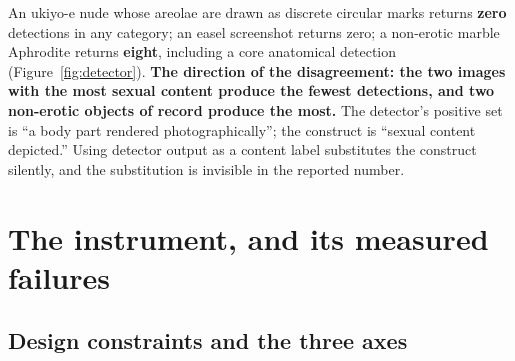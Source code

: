 \documentclass[11pt]{article}
\begin{document}
An ukiyo-e nude whose areolae are drawn as discrete circular marks returns
\textbf{zero} detections in any category; an easel screenshot returns zero; a
non-erotic marble Aphrodite returns \textbf{eight}, including a core anatomical
detection (Figure~\ref{fig:detector}). \textbf{The direction of the
disagreement: the two images with the most sexual content produce the fewest
detections, and two non-erotic objects of record produce the most.} The
detector's positive set is ``a body part rendered photographically''; the
construct is ``sexual content depicted.'' Using detector output as a content
label substitutes the construct silently, and the substitution is invisible in
the reported number.

\section{The instrument, and its measured failures}
\label{sec:axes}

\subsection{Design constraints and the three axes}
\end{document}
